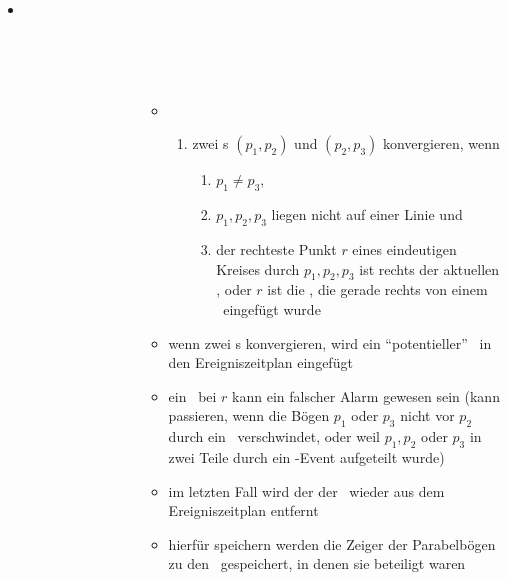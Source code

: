 \begin{itemize}
	\item[] \begin{description}
			\item[]\ \\\up\up \begin{description}
					\item[]\ \\\up
						\begin{description}
							\item[]\ \\\up
								\begin{minipage}{0.84\textwidth}
									\begin{itemize}
										\item[]
											\begin{enumerate}
											\setcounter{enumi}{\value{temp}}
												\item zwei \bpoint s $(p_1,p_2)$ und $(p_2,p_3)$ konvergieren, wenn
													\begin{enumerate}
														\item $p_1\neq p_3$,
														\item $p_1,p_2,p_3$ liegen nicht auf einer Linie und
														\item der rechteste Punkt $r$ eines eindeutigen Kreises durch $p_1,p_2,p_3$ ist rechts der aktuellen \sweep, oder $r$ ist die \site, die gerade rechts von einem \bpoint~eingefügt wurde
													\end{enumerate}
											\end{enumerate}
										\item wenn zwei \bpoint s konvergieren, wird ein ``potentieller'' \kreis~in den Ereigniszeitplan eingefügt
										\vspace*{-0.5\baselineskip}
										\item ein \kreis~bei $r$ kann ein falscher Alarm gewesen sein (kann passieren, wenn die Bögen $p_1$ oder $p_3$ nicht vor $p_2$ durch ein \kreis~verschwindet, oder weil $p_1,p_2$ oder $p_3$ in zwei Teile durch ein \site-Event aufgeteilt wurde)
										\vspace*{-0.5\baselineskip}
										\item im letzten Fall wird der der \kreis~wieder aus dem Ereigniszeitplan entfernt
										\vspace*{-0.5\baselineskip}
										\item hierfür speichern werden die Zeiger der Parabelbögen zu den \kreis~gespeichert, in denen sie beteiligt waren

\end{itemize}
\end{minipage}
\end{description}
\end{description}
\end{description}
\end{itemize}
